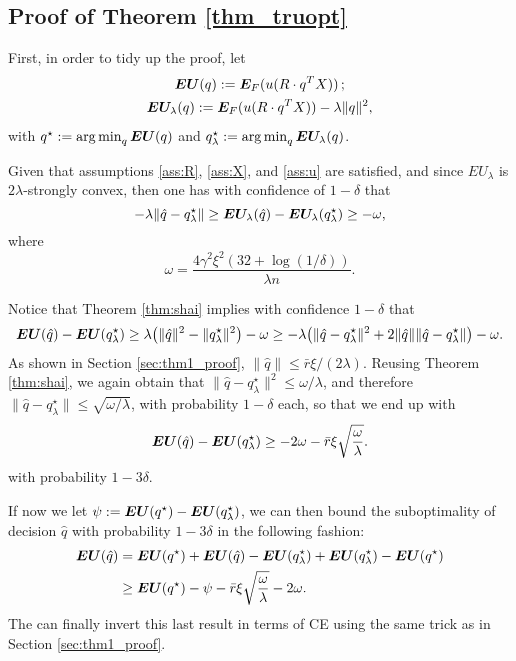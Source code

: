 \subsection{Proof of Theorem \ref{thm_truopt}}

First, in order to tidy up the proof, let
\begin{gather*}
  \bm{EU}(q) := \bm E_F(u(R\cdot q^T X))\,;\\
  \bm{EU}_\lambda(q) := \bm E_F(u(R\cdot q^T X)) - \lambda\|q\|^2,
\end{gather*}
with $q^\star := \operatorname*{arg\,min}_q \bm{EU}(q)$ and $q^\star_\lambda := \operatorname*{arg\,min}_q \bm{EU}_\lambda(q)$.

\begin{thm}\label{thm:shai}
  Given that assumptions \ref{ass:R}, \ref{ass:X}, and \ref{ass:u} are satisfied, and
  since $EU_\lambda$ is $2\lambda$-strongly convex, then one has with confidence of
  $1-\delta$ that
  \[
    -\lambda\|\hat q - q^\star_\lambda\| \geq \bm{EU}_\lambda(\hat q) - \bm{EU}_\lambda(q^\star_\lambda) \geq -\omega,
  \]
  where
  \[
    \omega = \frac{4\gamma^2\xi^2(32+\log(1/\delta))}{\lambda n}.
  \]
\end{thm}

Notice that Theorem \ref{thm:shai} implies with confidence $1-\delta$ that
\[
  \bm{EU}(\hat q) - \bm{EU}(q^\star_\lambda) \geq \lambda\bigl(\|\hat q\|^2 -
  \|q^\star_\lambda\|^2\bigr) -\omega
  \geq -\lambda\bigl(\|\hat q -
  q^\star_\lambda\|^2 +2\|\hat q\|\|\hat q - q^\star_\lambda\|\bigr) - \omega.
\]
As shown in Section \ref{sec:thm1_proof}, $\|\hat q\| \leq \bar r\xi/(2\lambda)$. Reusing
Theorem \ref{thm:shai}, we again obtain that
$\|\hat q - q^\star_\lambda\|^2 \leq \omega/\lambda$, and therefore
$\|\hat q - q^\star_\lambda\| \leq \sqrt{\omega/\lambda}$, with probability $1-\delta$
each, so that we end up with
\[
  \bm{EU}(\hat q) - \bm{EU}(q^\star_\lambda) \geq -2\omega - \bar r\xi\sqrt{\frac{\omega}{\lambda}}.
\]
with probability $1-3\delta$.

If now we let $\psi := \bm{EU}(q^\star) -\bm{EU}(q^\star_\lambda)$, we can then bound the
suboptimality of decision $\hat q$ with probability $1-3\delta$ in the following fashion:
\begin{align*}
  \bm{EU}(\hat q) &= \bm{EU}(q^\star) + \bm{EU}(\hat q) - \bm{EU}(q^\star_\lambda) + \bm{EU}(q^\star_\lambda)
                - \bm{EU}(q^\star)\\
              &\geq \bm{EU}(q^\star) - \psi - \bar r\xi\sqrt{\frac{\omega}{\lambda}} - 2\omega.
\end{align*}
The can finally invert this last result in terms of CE using the same trick as in Section
\ref{sec:thm1_proof}.

